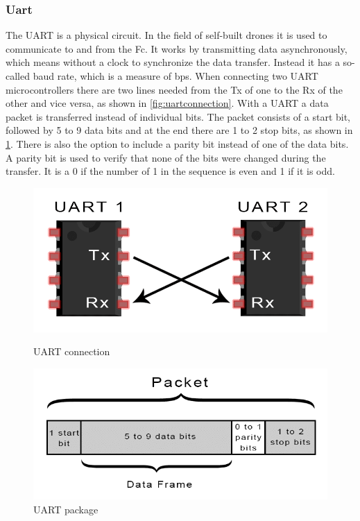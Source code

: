 \documentclass[svgnames]{article}
\begin{document}
	\subsubsection{Uart}
	The \gls{UART} is a physical circuit. In the field of self-built drones it is used to communicate to and from the \gls{Fc}. It works by transmitting data asynchronously, which means without a clock to synchronize the data transfer. Instead it has a so-called baud rate, which is a measure of \gls{bps}. When connecting two \gls{UART} microcontrollers there are two lines needed from the Tx of one to the Rx of the other and vice versa, as shown in \cref{fig:uartconnection}. With a \gls{UART} a data packet is transferred instead of individual bits. The packet consists of a start bit, followed by 5 to 9 data bits and at the end there are 1 to 2 stop bits, as shown in \cref{fig:uartpackage}. There is also the option to include a parity bit instead of one of the data bits. A parity bit is used to verify that none of the bits were changed during the transfer. It is a 0 if the number of 1 in the sequence is even and 1 if it is odd.
	\cite{uartprotocol} %
\begin{figure}[ht]
	\begin{minipage}[c]{0.4\textwidth}
		\includegraphics[width=\textwidth]{pictures/UARTconnection}
		\caption{\gls{UART} connection \cite{uartprotocol}}
		\label{fig:uartconnection}
	\end{minipage}
	\hfill
	\begin{minipage}[c]{0.4\textwidth}
		\includegraphics[width=\textwidth]{pictures/Uartpackage}
		\caption{\gls{UART} package \cite{uartprotocol}}
		\label{fig:uartpackage}
	\end{minipage}
	
\end{figure}
\end{document}
